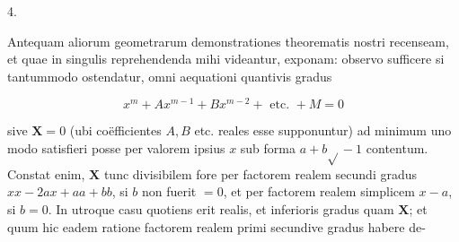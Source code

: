 \documentclass[10pt]{article}
\begin{document}
4.

Antequam aliorum geometrarum demonstrationes theorematis nostri recenseam, et quae in singulis reprehendenda mihi videantur, exponam: observo sufficere si tantummodo ostendatur, omni aequationi quantivis gradus

\[
x^{m}+A x^{m-1}+B x^{m-2}+\text { etc. }+M=0
\]

sive \(\boldsymbol{X}=0\) (ubi coëfficientes \(A, B\) etc. reales esse supponuntur) ad minimum uno modo satisfieri posse per valorem ipsius \(x\) sub forma \(a+b \sqrt{ }-1\) contentum. Constat enim, \(\boldsymbol{X}\) tunc divisibilem fore per factorem realem secundi gradus \(x x-2 a x+a a+b b\), si \(b\) non fuerit \(=0\), et per factorem realem simplicem \(x-a\), si \(b=0\). In utroque casu quotiens erit realis, et inferioris gradus quam \(\mathbf{X}\); et quum hic eadem ratione factorem realem primi secundive gradus habere de-
\end{document}
